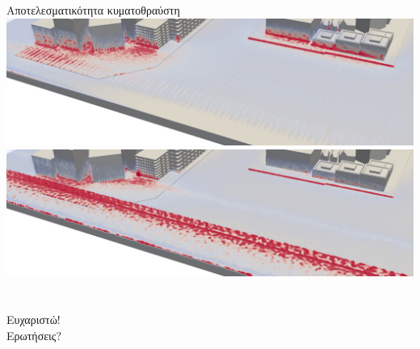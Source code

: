 \documentclass[8pt,sans,mathserif,aspectratio=43]{beamer}
\newcommand{\spacer}[0]{
  \vspace{5pt}}
\begin{document}
\begin{frame}{Αποτελεσματικότητα κυματοθραύστη}
  \includegraphics[width=\textwidth]{figures/if-city0-free.png}\\
  \includegraphics[width=\textwidth]{figures/if-city0-seawall.png}
\end{frame}



\section{}
\subsection{}
\begin{frame}
  \begin{center}
    \spacer\spacer\spacer\spacer\spacer\spacer
    Ευχαριστώ!\\
    \spacer\spacer\spacer\spacer\spacer\spacer
    Ερωτήσεις?
  \end{center}
\end{frame}
\end{document}
